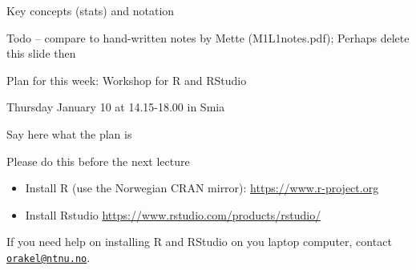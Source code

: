 \documentclass[10pt,ignorenonframetext,]{beamer}
\begin{document}
\begin{frame}{Key concepts (stats) and notation}

Todo -- compare to hand-written notes by Mette (M1L1notes.pdf); Perhaps
delete this slide then

\end{frame}

\begin{frame}{Plan for this week: Workshop for R and RStudio}

\begin{block}{Thursday January 10 at 14.15-18.00 in Smia}

Say here what the plan is

\end{block}

\end{frame}

\begin{frame}

\begin{block}{Please do this before the next lecture}

\vspace{2mm}

\begin{itemize}
\item
  Install R (use the Norwegian CRAN mirror):
  \url{https://www.r-project.org}
\item
  Install Rstudio \url{https://www.rstudio.com/products/rstudio/}
\end{itemize}

\vspace{4mm}

If you need help on installing R and RStudio on you laptop computer,
contact \href{mailto:orakel@ntnu.no}{\nolinkurl{orakel@ntnu.no}}.

\end{block}

\end{frame}
\end{document}
